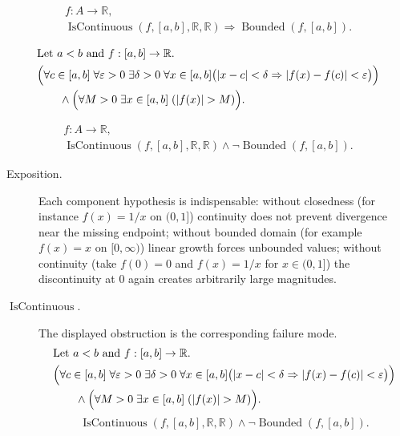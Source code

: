 \begin{remark*}
\[
\begin{aligned}
  f\colon A\to\mathbb{R},\\
\operatorname{IsContinuous}(f,[a,b],\mathbb{R},\mathbb{R}) \Longrightarrow \operatorname{Bounded}(f,[a,b]).
\end{aligned}
\]
\end{remark*}

\begin{remark*}
\[
\begin{aligned}
&\text{Let } a<b \text{ and } f:[a,b]\to\mathbb{R}.\\
&\Bigl(\forall c\in[a,b]\;\forall \varepsilon>0\;\exists \delta>0\;\forall x\in[a,b]\bigl(|x-c|<\delta \Rightarrow |f(x)-f(c)|<\varepsilon\bigr)\Bigr)\\
&\qquad\land \Bigl(\forall M>0\;\exists x\in[a,b]\;(|f(x)|>M)\Bigr).
\end{aligned}
\]
\end{remark*}

\begin{remark*}
\[
\begin{aligned}
  f\colon A\to\mathbb{R},\\
\operatorname{IsContinuous}(f,[a,b],\mathbb{R},\mathbb{R}) \land \neg\operatorname{Bounded}(f,[a,b]).
\end{aligned}
\]
\end{remark*}

\begin{remark*}
\begin{description}
  \item[Exposition.]
Each component hypothesis is indispensable: without closedness (for instance $f(x)=1/x$ on $(0,1]$) continuity does not prevent divergence near the missing endpoint; without bounded domain (for example $f(x)=x$ on $[0,\infty)$) linear growth forces unbounded values; without continuity (take $f(0)=0$ and $f(x)=1/x$ for $x\in(0,1]$) the discontinuity at $0$ again creates arbitrarily large magnitudes.


  \item[\(\operatorname{IsContinuous}.\)]
  The displayed obstruction is the corresponding failure mode.
  \[
\begin{aligned}
&\text{Let } a<b \text{ and } f:[a,b]\to\mathbb{R}.\\
&\Bigl(\forall c\in[a,b]\;\forall \varepsilon>0\;\exists \delta>0\;\forall x\in[a,b]\bigl(|x-c|<\delta \Rightarrow |f(x)-f(c)|<\varepsilon\bigr)\Bigr)\\
&\qquad\land \Bigl(\forall M>0\;\exists x\in[a,b]\;(|f(x)|>M)\Bigr).
\end{aligned}
  \]
  \[
\operatorname{IsContinuous}(f,[a,b],\mathbb{R},\mathbb{R}) \land \neg\operatorname{Bounded}(f,[a,b]).
  \]
\end{description}
\end{remark*}

